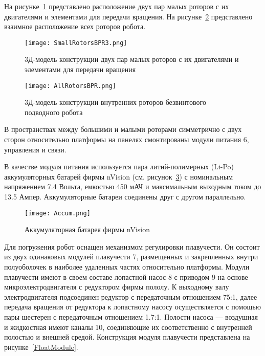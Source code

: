 На рисунке~\ref{SmallRotorsBPR3} представлено расположение двух пар малых роторов с их двигателями и элементами для передачи вращения. На рисунке~\ref{AllRotorsBPR} представлено взаимное расположение всех роторов робота.

\begin{figure}[h]
	\centering
	\texttt{[image: SmallRotorsBPR3.png]}%
	\caption{3Д-модель конструкции двух пар малых роторов с их двигателями и элементами для передачи вращения}
	\label{SmallRotorsBPR3}
\end{figure}

\begin{figure}[h]
	\centering
	\texttt{[image: AllRotorsBPR.png]}%
	\caption{3Д-модель конструкции внутренних роторов безвинтового подводного робота}
	\label{AllRotorsBPR}
\end{figure}



В пространствах между большими и малыми роторами симметрично с двух сторон относительно платформы на панелях смонтированы модули питания 6, управления и связи.

В качестве модуля питания используется пара литий-полимерных (Li-Po) аккумуляторных батарей фирмы nVision (см. рисунок~\ref{Accum}) с номинальным напряжением 7.4 Вольта, емкостью 450 мАЧ и максимальным выходным током до 13.5 Ампер. Аккумуляторные батареи соединены друг с другом параллельно.

\begin{figure}[h]
	\centering
	\texttt{[image: Accum.png]}%
	\caption{Аккумуляторная батарея фирмы nVision}
	\label{Accum}
\end{figure}

Для погружения робот оснащен механизмом регулировки плавучести. Он состоит из двух одинаковых модулей плавучести 7, размещенных и закрепленных внутри полуоболочек в наиболее удаленных частях относительно платформы. Модули плавучести имеют в своем составе лопастной насос 8 с приводом 9 на основе микроэлектродвигателя с редуктором фирмы пололу. К выходному валу электродвигателя подсоединен редуктор с передаточным отношением 75:1, далее передача вращения от редуктора к лопастному насосу осуществляется с помощью пары шестерен с передаточным отношением 1.7:1. Полости насоса --- воздушная и жидкостная имеют каналы 10, соединяющие их соответственно с внутренней полостью и внешней средой. Конструкция модуля плавучести представлена на рисунке~\ref{FloatModule}.

